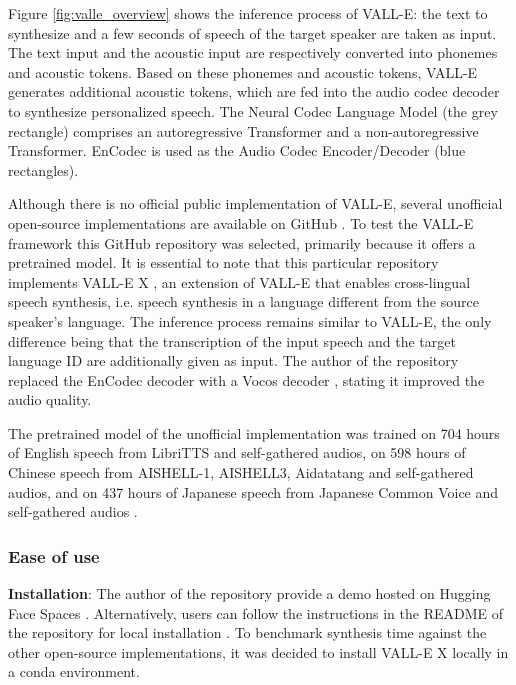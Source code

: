 Figure \ref{fig:valle_overview} shows the inference process of VALL-E: the text to synthesize and a few seconds of speech of the target speaker are taken as input. The text input and the acoustic input are respectively converted into phonemes and acoustic tokens. Based on these phonemes and acoustic tokens, VALL-E generates additional acoustic tokens, which are fed into the audio codec decoder to synthesize personalized speech. The Neural Codec Language Model (the grey rectangle) comprises an autoregressive Transformer and a non-autoregressive Transformer. EnCodec \cite{defossez2022high} is used as the Audio Codec Encoder/Decoder (blue rectangles). 

Although there is no official public implementation of VALL-E, several unofficial open-source implementations are available on GitHub \cite{valle, niu_vall-e_2023, songting_vall-e_2023}. To test the VALL-E framework this GitHub repository \cite{songting_vall-e_2023} was selected, primarily because it offers a pretrained model. It is essential to note that this particular repository implements VALL-E X \cite{zhang2023speak}, an extension of VALL-E that enables cross-lingual speech synthesis, i.e. speech synthesis in a language different from the source speaker's language. The inference process remains similar to VALL-E, the only difference being that the transcription of the input speech and the target language ID are additionally given as input. The author of the repository replaced the EnCodec decoder with a Vocos decoder \cite{siuzdak2023vocos}, stating it improved the audio quality. 

The pretrained model of the unofficial implementation was trained on 704 hours of English speech from LibriTTS and self-gathered audios, on 598 hours of Chinese speech from  AISHELL-1, AISHELL3, Aidatatang and self-gathered audios, and on 437 hours of Japanese speech from Japanese Common Voice and self-gathered audios \cite{noauthor_demo_nodate}.

\subsubsection{Ease of use}
\textbf{Installation}: The author of the repository provide a demo hosted on Hugging Face Spaces \cite{vallex_hugging_face}. Alternatively, users can follow the instructions in the README of the repository for local installation \cite{songting_vall-e_2023}. To benchmark synthesis time against the other open-source implementations, it was decided to install VALL-E X locally in a conda environment.

